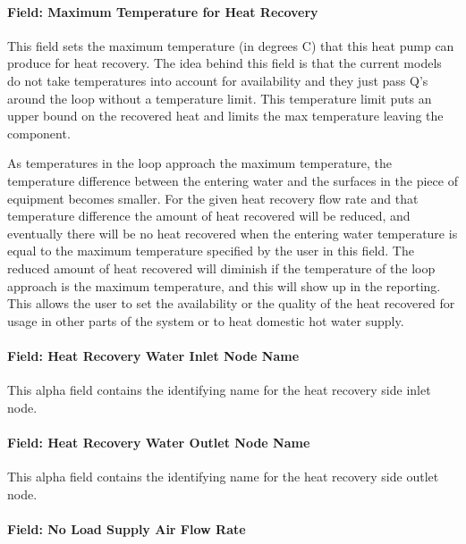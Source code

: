 \paragraph{Field: Maximum Temperature for Heat Recovery}\label{field-maximum-temperature-for-heat-recovery-1}

This field sets the maximum temperature (in degrees C) that this heat pump can produce for heat recovery. The idea behind this field is that the current models do not take temperatures into account for availability and they just pass Q's around the loop without a temperature limit. This temperature limit puts an upper bound on the recovered heat and limits the max temperature leaving the component.

As temperatures in the loop approach the maximum temperature, the temperature difference between the entering water and the surfaces in the piece of equipment becomes smaller. For the given heat recovery flow rate and that temperature difference the amount of heat recovered will be reduced, and eventually there will be no heat recovered when the entering water temperature is equal to the maximum temperature specified by the user in this field. The reduced amount of heat recovered will diminish if the temperature of the loop approach is the maximum temperature, and this will show up in the reporting. This allows the user to set the availability or the quality of the heat recovered for usage in other parts of the system or to heat domestic hot water supply.

\paragraph{Field: Heat Recovery Water Inlet Node Name}\label{field-heat-recovery-water-inlet-node-name-1-000}

This alpha field contains the identifying name for the heat recovery side inlet node.

\paragraph{Field: Heat Recovery Water Outlet Node Name}\label{field-heat-recovery-water-outlet-node-name-1-000}

This alpha field contains the identifying name for the heat recovery side outlet node.

\paragraph{Field: No Load Supply Air Flow Rate}\label{field-no-load-supply-air-flow-rate-4-000}

